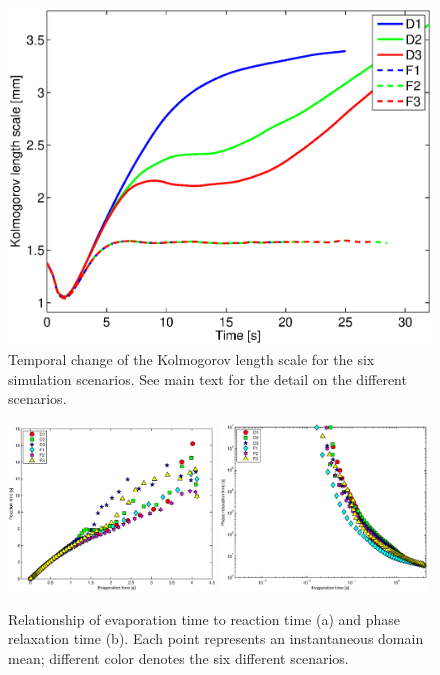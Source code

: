 \documentclass{article}
\begin{document}
\begin{figure}\centering
\includegraphics[width=\textwidth]{Figures/eta}
\caption{Temporal change of the Kolmogorov length scale for the six simulation
scenarios. See main text for the detail on the different scenarios.}
\end{figure}

\begin{figure}\centering
\includegraphics[width=0.49\textwidth]{Figures/tevap_treact}
\includegraphics[width=0.49\textwidth]{Figures/tevap_tphase}
\caption{Relationship of evaporation time to reaction time (a) and phase relaxation time
(b). Each point represents an instantaneous domain mean; different color denotes the six
different scenarios.}
\end{figure}
\end{document}
